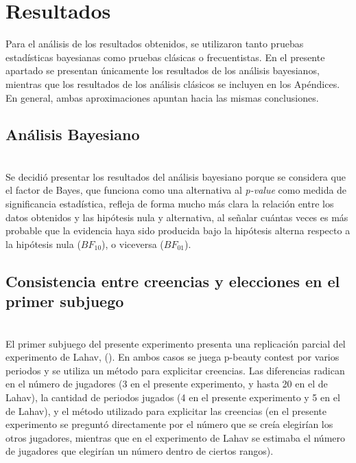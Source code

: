 \chapter{Resultados} %
\label{Cap_Res} %

Para el análisis de los resultados obtenidos, se utilizaron tanto pruebas estadísticas bayesianas como pruebas clásicas o frecuentistas. En el presente apartado se presentan únicamente los resultados de los análisis bayesianos, mientras que los resultados de los análisis clásicos se incluyen en los Apéndices. En general, ambas aproximaciones apuntan hacia las mismas conclusiones.\\

\section{Análisis Bayesiano}\\

Se decidió presentar los resultados del análisis bayesiano porque se considera que el factor de Bayes, que funciona como una alternativa al \textit{p-value} como medida de significancia estadística, refleja de forma mucho más clara la  relación entre los datos obtenidos y las hipótesis nula y alternativa, al señalar cuántas veces es más probable que la evidencia haya sido producida bajo la hipótesis alterna respecto a la hipótesis nula ($BF_{10}$), o viceversa ($BF_{01}$).\\

\section{Consistencia entre creencias y elecciones en el primer subjuego}\\

El primer subjuego del presente experimento presenta una replicación parcial del experimento de Lahav, (\citeyear{Lahav}). En ambos casos se juega p-beauty contest por varios periodos y se utiliza un método para explicitar creencias. Las diferencias radican en el número de jugadores (3 en el presente experimento, y hasta 20 en el de Lahav), la cantidad de periodos jugados (4 en el presente experimento y 5 en el de Lahav), y el método utilizado para explicitar las creencias (en el presente experimento se preguntó directamente por el número que se creía elegirían los otros jugadores, mientras que en el experimento de Lahav se estimaba el número de jugadores que elegirían un número dentro de ciertos rangos).\\

